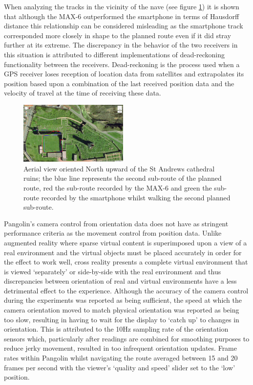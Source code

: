 When analyzing the tracks in the vicinity of the nave (see figure \ref{map_three}) it is shown that although the MAX-6 outperformed the smartphone in terms of Hausdorff distance this relationship can be considered misleading as the smartphone track corresponded more closely in shape to the planned route even if it did stray further at its extreme. The discrepancy in the behavior of the two receivers in this situation is attributed to different implementations of dead-reckoning functionality between the receivers. Dead-reckoning is the process used when a GPS receiver loses reception of location data from satellites and extrapolates its position based upon a combination of the last received position data and the velocity of travel at the time of receiving these data.
 
\begin{figure}[h]
\centering
\includegraphics[width=0.48\textwidth]{images/figure_6}
\caption{Aerial view oriented North upward of the St Andrews cathedral ruins; the blue line represents the second sub-route of the planned route, red the sub-route recorded by the MAX-6 and green the sub-route recorded by the smartphone whilst walking the second planned sub-route.}
\label{map_three}
\end{figure}

Pangolin's camera control from orientation data does not have as stringent performance criteria as the movement control from position data. Unlike augmented reality where sparse virtual content is superimposed upon a view of a real environment and the virtual objects must be placed accurately in order for the effect to work well, cross reality presents a complete virtual environment that is viewed `separately' or side-by-side with the real environment and thus discrepancies between orientation of real and virtual environments have a less detrimental effect to the experience. Although the accuracy of the camera control during the experiments was reported as being sufficient, the speed at which the camera orientation moved to match physical orientation was reported as being too slow, resulting in having to wait for the display to `catch up' to changes in orientation. This is attributed to the 10Hz sampling rate of the orientation sensors which, particularly after readings are combined for smoothing purposes to reduce jerky movement, resulted in too infrequent orientation updates. Frame rates within Pangolin whilst navigating the route averaged between 15 and 20 frames per second with the viewer's `quality and speed' slider set to the `low' position.

